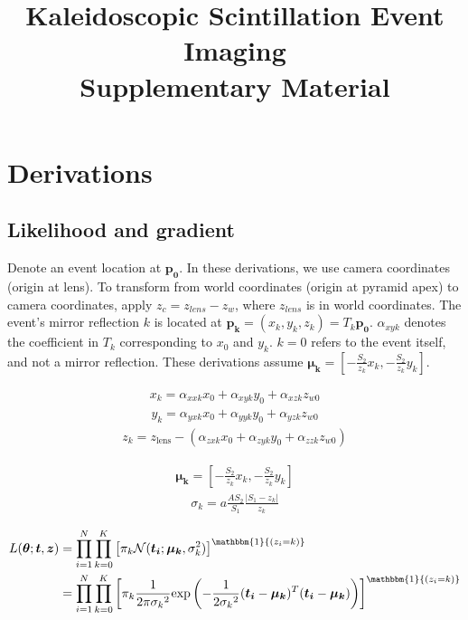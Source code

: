\documentclass{article}
\begin{document}
\title{Kaleidoscopic Scintillation Event Imaging \\
\large Supplementary Material}

\date{}

\maketitle

\section{Derivations}
\subsection{Likelihood and gradient} \label{sec:like}

Denote an event location at $\bm{p_0}$.
In these derivations, we use camera coordinates (origin at lens). 
To transform from world coordinates (origin at pyramid apex) to camera 
coordinates, apply $z_c = z_{lens} - z_w$, where $z_{lens}$ is in world coordinates.
The event's mirror reflection $k$ is located at $\bm{p_k}=(x_k,y_k,z_k)=T_k\bm{p_0}$.
$\alpha_{xyk}$ denotes the coefficient in $T_k$ corresponding to $x_0$ and $y_k$.
$k=0$ refers to the event itself, and not a mirror reflection.
These derivations assume $\bm{\mu_k} = \left[-\frac{S_2}{z_k} x_k, -\frac{S_2}{z_k} y_k\right]$. 



\begin{align}
x_k = \alpha_{xxk}x_0 + \alpha_{xyk}y_0 + \alpha_{xzk}z_{w0}
\end{align}
\begin{align}
y_k = \alpha_{yxk}x_0 + \alpha_{yyk}y_0 + \alpha_{yzk}z_{w0}
\end{align}
\begin{align}
z_k = z_\text{lens} - (\alpha_{zxk}x_0 + \alpha_{zyk}y_0 + \alpha_{zzk}z_{w0})
\end{align}


\begin{align}
\bm{\mu_k} = \left[-\frac{S_2}{z_k} x_k, -\frac{S_2}{z_k} y_k\right]
\end{align}
\begin{align}
\sigma_k = a \frac{AS_2}{S_1} \frac{|S_1-z_k|}{z_k}
\end{align}


\begin{align}
L(\bm{\theta};\bm{t},\bm{z}) &= \prod_{i=1}^N \prod_{k=0}^K \left[ \pi_k \mathcal{N}(\bm{t_i};\bm{\mu_k},\sigma_k^2) \right]^{\mathbbm{1}{(z_i=k)}} \\
&= \prod_{i=1}^N \prod_{k=0}^K \left[ \pi_k \frac{1}{2\pi{\sigma_k}^2} \text{exp}\left( -\frac{1}{2{\sigma_k}^2} (\bm{t_i}-\bm{\mu_k})^T(\bm{t_i}-\bm{\mu_k}) \right) \right]^{\mathbbm{1}{(z_i=k)}}
\end{align}
\end{document}

